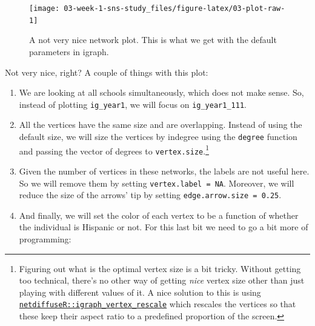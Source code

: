 \documentclass[]{book}
\newenvironment{Shaded}{\begin{snugshade}}{\end{snugshade}}
\newcommand{\DecValTok}[1]{\textcolor[rgb]{0.00,0.00,0.81}{#1}}
\newcommand{\KeywordTok}[1]{\textcolor[rgb]{0.13,0.29,0.53}{\textbf{#1}}}
\newcommand{\NormalTok}[1]{#1}
\newcommand{\OperatorTok}[1]{\textcolor[rgb]{0.81,0.36,0.00}{\textbf{#1}}}
\newcommand{\StringTok}[1]{\textcolor[rgb]{0.31,0.60,0.02}{#1}}
\begin{document}
\begin{figure}

{\centering \texttt{[image: 03-week-1-sns-study\_files/figure-latex/03-plot-raw-1]} 

}

\caption{A not very nice network plot. This is what we get with the default parameters in igraph.}\label{fig:03-plot-raw}
\end{figure}

Not very nice, right? A couple of things with this plot:

\begin{enumerate}
\def\labelenumi{\arabic{enumi}.}
\item
  We are looking at all schools simultaneously, which does not make sense. So, instead of plotting \texttt{ig\_year1}, we will focus on \texttt{ig\_year1\_111}.
\item
  All the vertices have the same size and are overlapping. Instead of using the default size, we will size the vertices by indegree using the \texttt{degree} function and passing the vector of degrees to \texttt{vertex.size}.\footnote{Figuring out what is the optimal vertex size is a bit tricky. Without getting too technical, there's no other way of getting \emph{nice} vertex size other than just playing with different values of it. A nice solution to this is using \href{https://www.rdocumentation.org/packages/netdiffuseR/versions/1.17.0/topics/rescale_vertex_igraph}{\texttt{netdiffuseR::igraph\_vertex\_rescale}} which rescales the vertices so that these keep their aspect ratio to a predefined proportion of the screen.}
\item
  Given the number of vertices in these networks, the labels are not useful here. So we will remove them by setting \texttt{vertex.label\ =\ NA}. Moreover, we will reduce the size of the arrows' tip by setting \texttt{edge.arrow.size\ =\ 0.25}.
\item
  And finally, we will set the color of each vertex to be a function of whether the individual is Hispanic or not. For this last bit we need to go a bit more of programming:
\end{enumerate}

\begin{Shaded}
\end{Shaded}
\end{document}

